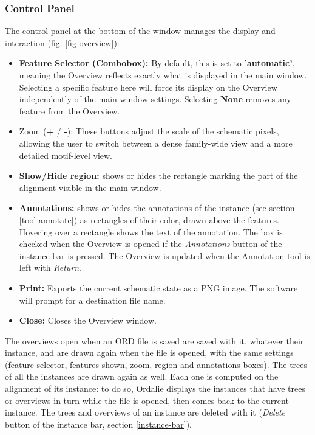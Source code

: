 \documentclass[a4paper]{article}
\begin{document}
\subsubsection{Control Panel}
The control panel at the bottom of the window manages the display and interaction (fig. \ref{fig-overview}):

\begin{itemize}
\item \textbf{Feature Selector (Combobox):} By default, this is set to \textbf{'automatic'}, meaning the Overview reflects exactly what is displayed in the main window. Selecting a specific feature here will force its display on the Overview independently of the main window settings. Selecting \textbf{None} removes any feature from the Overview.
    \item Zoom (\textbf{+} / \textbf{-}): These buttons adjust the scale of the schematic pixels, allowing the user to switch between a dense family-wide view and a more detailed motif-level view.
    \item \textbf{Show/Hide region:} shows or hides the rectangle marking the part of the alignment visible in the main window.
    \item \textbf{Annotations:} shows or hides the annotations of the instance (see section \ref{tool-annotate}) as rectangles of their color, drawn above the features. Hovering over a rectangle shows the text of the annotation. The box is checked when the Overview is opened if the \textit{Annotations} button of the instance bar is pressed. The Overview is updated when the Annotation tool is left with \textit{Return}.
    \item \textbf{Print:} Exports the current schematic state as a PNG image. The software will prompt for a destination file name.
    \item \textbf{Close:} Closes the Overview window.
\end{itemize}

The overviews open when an ORD file is saved are saved with it, whatever their instance, and are drawn again when the file is opened, with the same settings (feature selector, features shown, zoom, region and annotations boxes). The trees of all the instances are drawn again as well. Each one is computed on the alignment of its instance: to do so, Ordalie displays the instances that have trees or overviews in turn while the file is opened, then comes back to the current instance. The trees and overviews of an instance are deleted with it (\textit{Delete} button of the instance bar, section \ref{instance-bar}).
\end{document}
